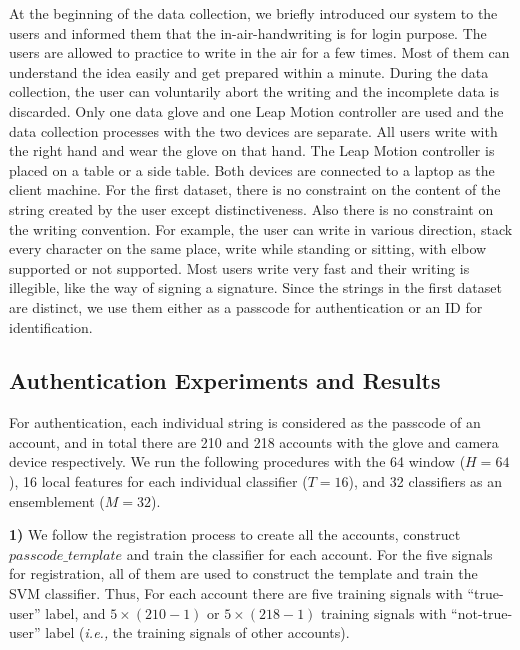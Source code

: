 \documentclass[conference]{IEEEtran}
\begin{document}

At the beginning of the data collection, we briefly introduced our system to the users and informed them that the in-air-handwriting is for login purpose. The users are allowed to practice to write in the air for a few times. Most of them can understand the idea easily and get prepared within a minute. During the data collection, the user can voluntarily abort the writing and the incomplete data is discarded. Only one data glove and one Leap Motion controller are used and the data collection processes with the two devices are separate. All users write with the right hand and wear the glove on that hand. The Leap Motion controller is placed on a table or a side table. Both devices are connected to a laptop as the client machine. For the first dataset, there is no constraint on the content of the string created by the user except distinctiveness. Also there is no constraint on the writing convention. For example, the user can write in various direction, stack every character on the same place, write while standing or sitting, with elbow supported or not supported. Most users write very fast and their writing is illegible, like the way of signing a signature. Since the strings in the first dataset are distinct, we use them either as a passcode for authentication or an ID for identification.

\subsection{Authentication Experiments and Results}

For authentication, each individual string is considered as the passcode of an account, and in total there are 210 and 218 accounts with the glove and camera device respectively. We run the following procedures with the 64 window ($H = 64$), 16 local features for each individual classifier ($T = 16$), and 32 classifiers as an ensemblement ($M = 32$).

\textbf{1)} We follow the registration process to create all the accounts, construct $passcode\_template$ and train the classifier for each account. For the five signals for registration, all of them are used to construct the template and train the SVM classifier. Thus, For each account there are five training signals with ``true-user'' label, and $5 \times (210 - 1)$ or $5 \times (218 - 1)$ training signals with ``not-true-user'' label (\textit{i.e.,} the training signals of other accounts).
\end{document}
